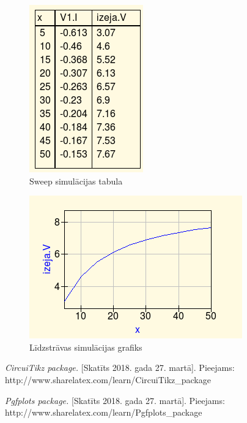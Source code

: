 \documentclass{report}
\begin{document}
\begin{figure}[t] 
\centering
    \includegraphics[width=\textwidth, height=220 pt, keepaspectratio]{sweep.png}
    \caption{Sweep simulācijas tabula}
    \label{fig:2.4}
\end{figure}

\newpage

\begin{figure}[h]
\centering
 \includegraphics[width=\textwidth, height=\textheight, keepaspectratio]{Graf.png}
    \caption{Līdzstrāvas simulācijas grafiks}
    \label{fig:2.5}
\end{figure}
\label{s_nobeigums}

\begin{thebibliography}{9}
\textit{CircuiTikz package.} [Skatīts 2018. gada 27. martā].
Pieejams: http://www.sharelatex.com/learn/CircuiTikz\_{}package

\textit{Pgfplots package.} [Skatīts 2018. gada 27. martā].
Pieejams: http://www.sharelatex.com/learn/Pgfplots\_{}package
 
\end{thebibliography}
\end{document}
